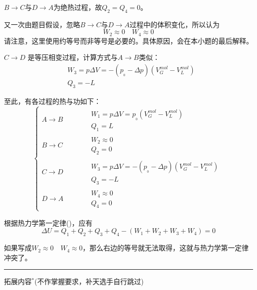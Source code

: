 \begin{solution}
        $B\rightarrow C$与$D\rightarrow A$为绝热过程，故$Q_2 = Q_4 = 0$。
		
		又一次由题目假设，忽略$B\rightarrow C$与$D\rightarrow A$过程中的体积变化，所以认为
		\[W_2\approx 0\quad W_4\approx 0\]
		请注意，这里使用约等号而非等号是必要的。具体原因，会在本小题的最后解释。
		
		$C\rightarrow D$ 是等压相变过程，计算方式与$A\rightarrow B$类似：
		\begin{equation*}
			\begin{aligned}
				&W_3 = p\Delta V = -(p_{_0} - \Delta p)(V_{G}^{mol}-V_{L}^{mol})\\
				&Q_3 = -L
			\end{aligned}
		\end{equation*}
		
		至此，有各过程的热与功如下：
		\[\left\{
			\begin{aligned}
				A\rightarrow B & \qquad\begin{aligned}
					&W_1= p\Delta V = p_{_0}(V_{G}^{mol}-V_{L}^{mol})\\
					&Q_1 = L
				\end{aligned}
				\\[1ex]
				B\rightarrow C & \qquad\begin{aligned}
					&W_2\approx 0\\
					&Q_2 = 0
				\end{aligned}
				\\[1ex]
				C\rightarrow D & \qquad\begin{aligned}
					&W_3 = p\Delta V = -(p_{_0} - \Delta p)(V_{G}^{mol}-V_{L}^{mol})\\
					&Q_3 = -L
				\end{aligned}
				\\[1ex]
				D\rightarrow A & \qquad\begin{aligned}
					&W_4\approx 0\\
					&Q_4 = 0
				\end{aligned}
			\end{aligned}
		\right.\]
		
		根据热力学第一定律()，应有
		\[\Delta U= Q_1+Q_2+Q_3+Q_4-(W_1+W_2+W_3+W_4)=0\]
		
		如果写成$W_2\approx 0\quad W_4\approx 0$，那么右边的等号就无法取得，这就与热力学第一定律冲突了。
		\vspace*{1ex}		
		\hrule
		{
			\em
			\begin{center}
				拓展内容$^*$(不作掌握要求，补天选手自行跳过)
			\end{center}
			
}
\end{solution}
